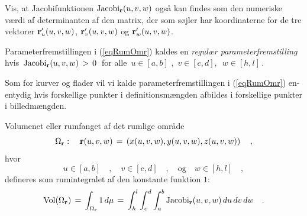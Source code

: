 \begin{exercise}
Vis, at Jacobifunktionen $\operatorname{Jacobi}_{\bf r}(u,v,w)$ også kan findes som den numeriske
værdi af determinanten af den matrix, der som søjler har
koordinaterne for de tre vektorer ${\bf r}'_{u}(u,v,w)$, ${\bf
r}'_{v}(u,v,w)$ og ${\bf r}'_{w}(u,v,w)$.
\end{exercise}

\begin{definition} \label{defReParamSpatial}
Parameterfremstillingen i (\ref{eqRumOmr}) kaldes en {\em{{regulær parameterfremstilling}}} hvis
$\, \operatorname{Jacobi}_{\bf r}(u,v,w)\, > \, 0\,$ for alle $\, u
\in [a, b] \, \, , \, \,  v \in [c,d] , \, \, \,  w \in [h,
l]\, $.
\end{definition}

\begin{definition} \label{defEnEntydSpatial}
Som for kurver og flader vil vi kalde parameterfremstillingen i
(\ref{eqRumOmr}) {en-entydig} hvis forskellige punkter i
definitionsmængden afbildes i forskellige punkter i billedmængden.
\end{definition}



\begin{definition} \label{defRumfang}
{Volumenet} eller {rumfanget} af det rumlige område
\begin{equation}
\Omega_{\bf r}: \quad {\bf r}(u,v,w) \, = \, \left(x(u,v,w),
y(u,v,w), z(u,v,w)\right) \quad ,
\end{equation}
hvor
\begin{equation}
u \in [a, b] \quad , \quad
 v \in [c,d] \quad ,\quad \textrm{og} \quad  w \in [h, l] \quad ,
\end{equation}
defineres som
rumintegralet af den konstante funktion $1$:
\begin{equation} \label{eqRumintegralVolumen}
\operatorname{Vol}(\Omega_{\bf r}) \, = \, \int_{\Omega_{\bf r}} 1 \, d\mu \, =
\, \int_{h}^{l}\int_{c}^{d} \int_{a}^{b} \operatorname{Jacobi}_{\bf r}(u,v,w)\,du
\, dv \, dw \quad .
\end{equation}
\end{definition}


